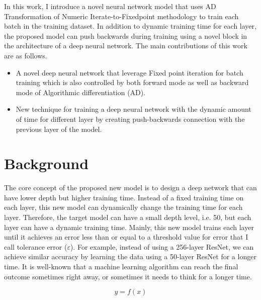 \documentclass{article}
\begin{document}
In this work, I introduce a novel neural network model that uses AD Transformation of Numeric Iterate-to-Fixedpoint methodology to train each batch in the training dataset. In addition to dynamic training time for each layer, the proposed model can push backwards during training using a novel block in the architecture of a deep neural network. The main contributions of this work are as follows.

\begin{itemize}
	\item A novel deep neural network that leverage Fixed point iteration for batch training which is also controlled by both forward mode as well as backward mode of Algorithmic differentiation (AD).
	\item New technique for training a deep neural network with the dynamic amount of time for different layer by creating push-backwards connection with the previous layer of the model.
\end{itemize}

\section{Background}
The core concept of the proposed new model is to design a deep network that can have lower depth but higher training time. Instead of a fixed training time on each layer, this new model can dynamically change the training time for each layer. Therefore, the target model can have a small depth level, i.e. 50, but each layer can have a dynamic training time. Mainly, this new model trains each layer until it achieves an error less than or equal to a threshold value for error that I call tolerance error ($\varepsilon$).  For example, instead of using a 256-layer ResNet, we can achieve similar accuracy by learning the data using a 50-layer ResNet for a longer time.  
It is well-known that a machine learning algorithm can reach the final outcome sometimes right away, or sometimes it needs to think for a longer time. 

\begin{equation}
y=f(x)
\label{eq:net}
\end{equation}
\end{document}
